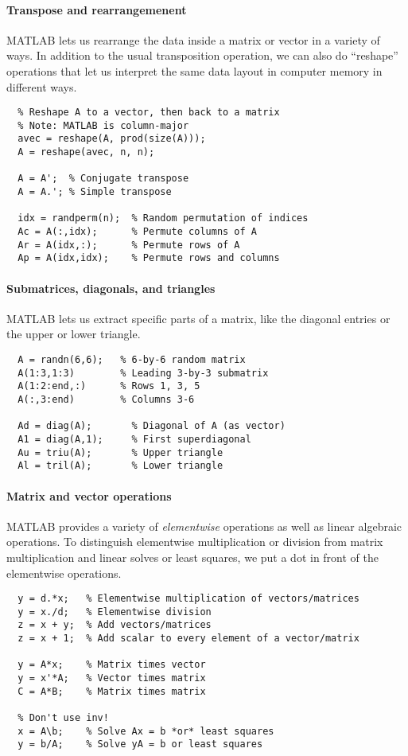 \documentclass[12pt, leqno]{article}
\begin{document}
\paragraph{Transpose and rearrangemenent}
MATLAB lets us rearrange the data inside a matrix or vector in
a variety of ways.  In addition to the usual transposition
operation, we can also do ``reshape'' operations that let us
interpret the same data layout in computer memory in different ways.
\begin{lstlisting}
  % Reshape A to a vector, then back to a matrix
  % Note: MATLAB is column-major
  avec = reshape(A, prod(size(A)));
  A = reshape(avec, n, n);
  
  A = A';  % Conjugate transpose
  A = A.'; % Simple transpose

  idx = randperm(n);  % Random permutation of indices
  Ac = A(:,idx);      % Permute columns of A
  Ar = A(idx,:);      % Permute rows of A
  Ap = A(idx,idx);    % Permute rows and columns
\end{lstlisting}

\paragraph{Submatrices, diagonals, and triangles}
MATLAB lets us extract specific parts of a matrix, like the diagonal
entries or the upper or lower triangle.
\begin{lstlisting}
  A = randn(6,6);   % 6-by-6 random matrix
  A(1:3,1:3)        % Leading 3-by-3 submatrix
  A(1:2:end,:)      % Rows 1, 3, 5
  A(:,3:end)        % Columns 3-6
  
  Ad = diag(A);       % Diagonal of A (as vector)
  A1 = diag(A,1);     % First superdiagonal
  Au = triu(A);       % Upper triangle
  Al = tril(A);       % Lower triangle
\end{lstlisting}

\paragraph{Matrix and vector operations}
MATLAB provides a variety of {\em elementwise} operations as well as
linear algebraic operations.  To distinguish elementwise
multiplication or division from matrix multiplication and linear
solves or least squares, we put a dot in front of the elementwise
operations.
\begin{lstlisting}
  y = d.*x;   % Elementwise multiplication of vectors/matrices
  y = x./d;   % Elementwise division
  z = x + y;  % Add vectors/matrices
  z = x + 1;  % Add scalar to every element of a vector/matrix
  
  y = A*x;    % Matrix times vector
  y = x'*A;   % Vector times matrix
  C = A*B;    % Matrix times matrix

  % Don't use inv!
  x = A\b;    % Solve Ax = b *or* least squares
  y = b/A;    % Solve yA = b or least squares
\end{lstlisting}
\end{document}
